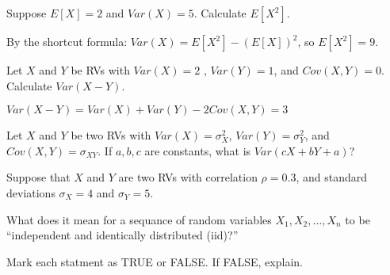 \documentclass[addpoints,12pt]{exam}
\begin{document}
\begin{questions}
\question Suppose $E[X] = 2$ and $Var(X) = 5$. Calculate $E[X^2]$.
\begin{solution}
  By the shortcut formula: $Var(X) = E[X^2] - \left( E[X] \right)^2$, so $E[X^2] = 9$.
\end{solution}

\question Let $X$ and $Y$ be RVs with $Var(X) = 2$ , $Var(Y) = 1$, and $Cov(X,Y) = 0$. Calculate $Var(X - Y)$.
\begin{solution}
  $Var(X - Y) = Var(X) + Var(Y) - 2 Cov(X,Y) = 3$
\end{solution}

\question Let $X$ and $Y$ be two RVs with $Var(X) = \sigma_X^2$, $Var(Y) = \sigma_Y^2$, and $Cov(X,Y) = \sigma_{XY}$. If $a,b,c$ are constants, what is $Var(cX + bY + a)$?

\question Suppose that $X$ and $Y$ are two RVs with correlation $\rho = 0.3$, and standard deviations $\sigma_X = 4$ and $\sigma_Y = 5$.

\question What does it mean for a sequance of random variables $X_1, X_2, \dots, X_n$ to be ``independent and identically distributed (iid)?''

\question Mark each statment as TRUE or FALSE. If FALSE, explain.


\end{questions}
\end{document}
